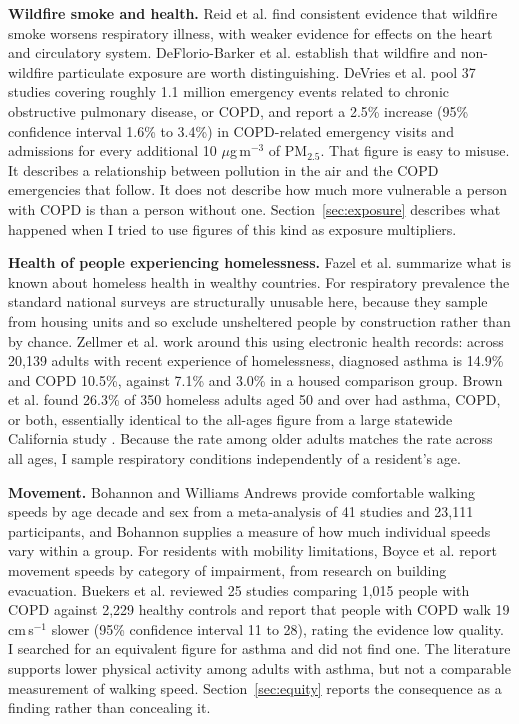 \documentclass[graybox]{svmult}
\begin{document}
\textbf{Wildfire smoke and health.} Reid et al. \cite{reid2016} find consistent
evidence that wildfire smoke worsens respiratory illness, with weaker evidence
for effects on the heart and circulatory system. DeFlorio-Barker et al.
\cite{deflorio2019} establish that wildfire and non-wildfire particulate exposure
are worth distinguishing. DeVries et al. \cite{devries2017} pool 37 studies
covering roughly 1.1 million emergency events related to chronic obstructive
pulmonary disease, or COPD, and report a 2.5\% increase (95\% confidence interval
1.6\% to 3.4\%) in COPD-related emergency visits and admissions for every
additional 10 $\mu$g\,m$^{-3}$ of PM$_{2.5}$. That figure is easy to misuse. It
describes a relationship between pollution in the air and the COPD emergencies
that follow. It does not describe how much more vulnerable a person with COPD is
than a person without one. Section~\ref{sec:exposure} describes what happened
when I tried to use figures of this kind as exposure multipliers.

\textbf{Health of people experiencing homelessness.} Fazel et al.
\cite{fazel2014} summarize what is known about homeless health in wealthy
countries. For respiratory prevalence the standard national surveys are
structurally unusable here, because they sample from housing units and so exclude
unsheltered people by construction rather than by chance. Zellmer et al.
\cite{zellmer2025} work around this using electronic health records: across
20,139 adults with recent experience of homelessness, diagnosed asthma is 14.9\%
and COPD 10.5\%, against 7.1\% and 3.0\% in a housed comparison group. Brown et
al. \cite{brown2017} found 26.3\% of 350 homeless adults aged 50 and over had
asthma, COPD, or both, essentially identical to the all-ages figure from a large
statewide California study \cite{ucsf2023}. Because the rate among older adults
matches the rate across all ages, I sample respiratory conditions independently
of a resident's age.

\textbf{Movement.} Bohannon and Williams Andrews \cite{bohannon2011} provide
comfortable walking speeds by age decade and sex from a meta-analysis of 41
studies and 23,111 participants, and Bohannon \cite{bohannon1997} supplies a
measure of how much individual speeds vary within a group. For residents with
mobility limitations, Boyce et al. \cite{boyce1999} report movement speeds by
category of impairment, from research on building evacuation. Buekers et al.
\cite{buekers2024} reviewed 25 studies comparing 1,015 people with COPD against
2,229 healthy controls and report that people with COPD walk 19 cm\,s$^{-1}$
slower (95\% confidence interval 11 to 28), rating the evidence low quality. I
searched for an equivalent figure for asthma and did not find one. The literature
supports lower physical activity among adults with asthma, but not a comparable
measurement of walking speed. Section~\ref{sec:equity} reports the consequence as
a finding rather than concealing it.
\end{document}
